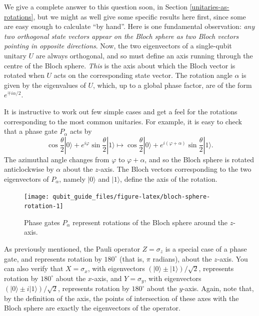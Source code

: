 \documentclass[fleqn,a4paper]{article}
\theoremstyle{definition}
\theoremstyle{definition}
\theoremstyle{definition}
\theoremstyle{definition}
\theoremstyle{remark}
\begin{document}
We give a complete answer to this question soon, in Section \ref{unitaries-as-rotations}, but we might as well give some specific results here first, since some are easy enough to calculate ``by hand''.
Here is one fundamental observation: \emph{any two orthogonal state vectors appear on the Bloch sphere as two Bloch vectors pointing in opposite directions}.
Now, the two eigenvectors of a single-qubit unitary \(U\) are always orthogonal, and so must define an axis running through the centre of the Bloch sphere.
\emph{This} is the axis about which the Bloch vector is rotated when \(U\) acts on the corresponding state vector.
The rotation angle \(\alpha\) is given by the eigenvalues of \(U\), which, up to a global phase factor, are of the form \(e^{\mp i\alpha/2}\).

It is instructive to work out few simple cases and get a feel for the rotations corresponding to the most common unitaries.
For example, it is easy to check that a phase gate \(P_\alpha\) acts by
\[
  \cos\frac{\theta}{2}|0\rangle + e^{i\varphi}\sin\frac{\theta}{2}|1\rangle
  \longmapsto
  \cos\frac{\theta}{2}|0\rangle + e^{i(\varphi+\alpha)}\sin\frac{\theta}{2}|1\rangle.
\]
The azimuthal angle changes from \(\varphi\) to \(\varphi+\alpha\), and so the Bloch sphere is rotated anticlockwise by \(\alpha\) about the \(z\)-axis.
The Bloch vectors corresponding to the two eigenvectors of \(P_\alpha\), namely \(|0\rangle\) and \(|1\rangle\), define the axis of the rotation.



\begin{figure}[H]

{\centering \texttt{[image: qubit\_guide\_files/figure-latex/bloch-sphere-rotation-1]} 

}

\caption{Phase gates \(P_\alpha\) represent rotations of the Bloch sphere around the \(z\)-axis.}\label{fig:bloch-sphere-rotation}
\end{figure}

As previously mentioned, the Pauli operator \(Z=\sigma_z\) is a special case of a phase gate, and represents rotation by \({180}^{\circ}\) (that is, \(\pi\) radians), about the \(z\)-axis.
You can also verify that \(X=\sigma_x\), with eigenvectors \({(|0\rangle\pm|1\rangle)/\sqrt{2}}\), represents rotation by \({180}^{\circ}\) about the \(x\)-axis, and \(Y=\sigma_y\), with eigenvectors \({(|0\rangle\pm i|1\rangle)/\sqrt{2}}\), represents rotation by \({180}^{\circ}\) about the \(y\)-axis.
Again, note that, by the definition of the axis, the points of intersection of these axes with the Bloch sphere are exactly the eigenvectors of the operator.
\end{document}
